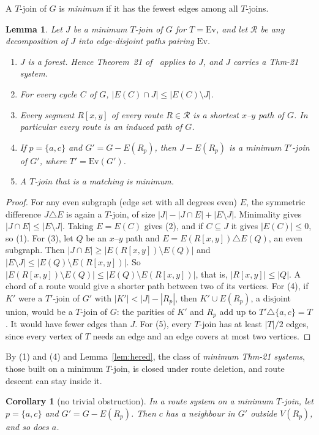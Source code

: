 \documentclass[11pt]{amsart}
\newtheorem{lemma}[theorem]{Lemma}
\newtheorem{corollary}[theorem]{Corollary}
\theoremstyle{definition}
\newcommand{\Ev}{\mathrm{Ev}}
\newcommand{\cR}{\mathcal R}
\begin{document}
A $T$-join of $G$ is \emph{minimum} if it has the fewest edges among all $T$-joins.

\begin{lemma}\label{lem:min}
Let $J$ be a minimum $T$-join of $G$ for $T=\Ev$, and let $\cR$ be any decomposition of $J$ into
edge-disjoint paths pairing $\Ev$.
\begin{enumerate}
\item $J$ is a forest. Hence Theorem~21 of~\cite{EMM} applies to $J$, and $J$ carries a Thm-21 system.
\item For every cycle $C$ of $G$, $|E(C)\cap J|\le|E(C)\setminus J|$.
\item Every segment $R[x,y]$ of every route $R\in\cR$ is a shortest $x$--$y$ path of $G$. In particular
every route is an induced path of $G$.
\item If $p=\{a,c\}$ and $G'=G-E(R_p)$, then $J-E(R_p)$ is a minimum $T'$-join of $G'$, where
$T'=\Ev(G')$.
\item A $T$-join that is a matching is minimum.
\end{enumerate}
\end{lemma}

\begin{proof}
For any even subgraph (edge set with all degrees even) $E$, the symmetric difference $J\triangle E$ is again
a $T$-join, of size $|J|-|J\cap E|+|E\setminus J|$. Minimality gives $|J\cap E|\le|E\setminus J|$.
Taking $E=E(C)$ gives (2), and if $C\subseteq J$ it gives $|E(C)|\le0$, so (1). For (3), let $Q$ be an
$x$--$y$ path and $E=E(R[x,y])\triangle E(Q)$, an even subgraph. Then
$|J\cap E|\ge|E(R[x,y])\setminus E(Q)|$ and $|E\setminus J|\le|E(Q)\setminus E(R[x,y])|$. So
$|E(R[x,y])\setminus E(Q)|\le|E(Q)\setminus E(R[x,y])|$, that is, $|R[x,y]|\le|Q|$. A chord of a route
would give a shorter path between two of its vertices. For (4), if $K'$ were a $T'$-join of $G'$ with
$|K'|<|J|-|R_p|$, then $K'\cup E(R_p)$, a disjoint union, would be a $T$-join of $G$: the parities of
$K'$ and $R_p$ add up to $T'\triangle\{a,c\}=T$. It would have fewer edges than $J$. For (5), every
$T$-join has at least $|T|/2$ edges, since every vertex of $T$ needs an edge and an edge covers at most
two vertices.
\end{proof}

By (1) and (4) and Lemma~\ref{lem:hered}, the class of \emph{minimum Thm-21 systems}, those built on a
minimum $T$-join, is closed under route deletion, and route descent can stay inside it.

\begin{corollary}[no trivial obstruction]\label{cor:triv}
In a route system on a minimum $T$-join, let $p=\{a,c\}$ and $G'=G-E(R_p)$. Then $c$ has a neighbour in
$G'$ outside $V(R_p)$, and so does $a$.
\end{corollary}
\end{document}
